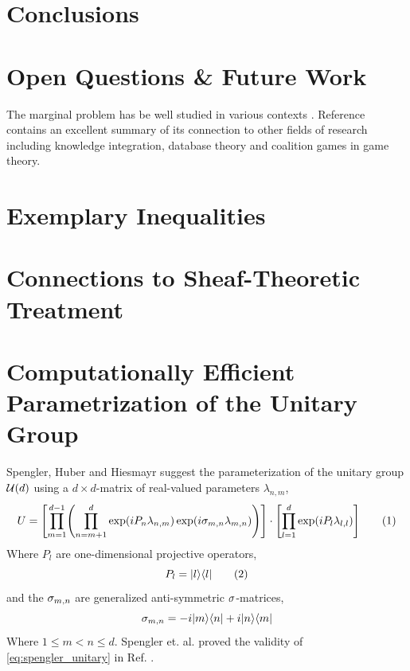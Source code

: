 \documentclass[aps, 10pt, english, twoside, pra, nofootinbib, longbibliography]{revtex4-1}
\theoremstyle{plain}
\theoremstyle{definition}
\theoremstyle{remark}
\begin{document}
    \section{Conclusions}
    \section{Open Questions \& Future Work}
    The marginal problem has be well studied in various contexts \cite[\ldots]{Vorobev_1962,Inflation,Fritz_2011}. Reference \cite{Fritz_2011} contains an excellent summary of its connection to other fields of research including knowledge integration, database theory and coalition games in game theory.
    \appendix
    \section{Exemplary Inequalities}
    \section{Connections to Sheaf-Theoretic Treatment}
    \section{Computationally Efficient Parametrization of the Unitary Group}
    Spengler, Huber and Hiesmayr \cite{Spengler_2010_Unitary} suggest the parameterization of the unitary group $\mathcal{U}\br{d}$ using a $d\times d$-matrix of real-valued parameters $\lambda_{n, m}$,
    \[ U = \bs{\prod_{m=1}^{d-1} \br{\prod_{n=m+1}^{d} \exp\br{i P_n \lambda_{n,m}}\exp\br{i \si_{m,n} \lambda_{m,n}}}} \cdot \bs{\prod_{l=1}^{d} \exp\br{iP_l \lambda_{l,l}}}  \eq \label{eq:spengler_unitary} \]
    Where $P_l$ are one-dimensional projective operators,
    \[ P_l = \ket{l}\bra{l} \eq \label{eq:projective_operator} \]
    and the $\sigma_{m,n}$ are generalized anti-symmetric $\sigma$-matrices,
    \[ \sigma_{m,n} = -i \ket{m}\bra{n} +i \ket{n}\bra{m} \]
    Where $1 \leq m < n \leq d$. Spengler et. al. proved the validity of \cref{eq:spengler_unitary} in Ref. \cite{Spengler_2010_Unitary}.
\end{document}
